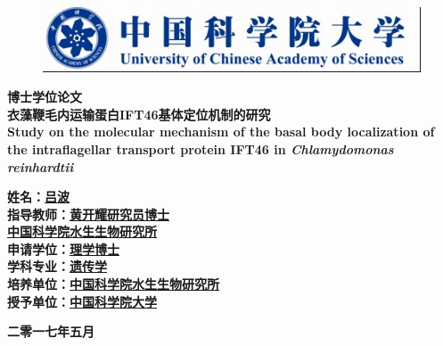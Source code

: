 \begin{titlepage}
\small
{}\uline{\makebox[7em][r]{}}\hfill {}
\uline{\makebox[7em][r]{}}

\uline{\makebox[7em][r]{}}\hfill {}
\uline{\makebox[7em][r]{}}
\normalsize

\vspace{10mm}

\begin{figure}[!h]
\centering
\graphicspath{{figures/}}
\includegraphics[trim=0 1 1 0, clip=true]{logo.jpg}
\end{figure}

\vspace{10mm}

\begin{center}
 \textbf{博士学位论文}\\[10mm]
 \textbf{衣藻鞭毛内运输蛋白IFT46基体定位机制的研究}\\
 \textbf{Study on the molecular mechanism of the basal body localization of the intraflagellar transport protein IFT46 in \textit{Chlamydomonas reinhardtii}}\\[10mm]
\end{center}
\large \textbf{姓\qquad 名：}\uline{\hfill\textbf{吕\quad 波}\hfill}\\
\large \textbf{指导教师：}\uline{\hfill{\textbf{黄开耀}\quad \textbf{研究员}\quad \textbf{博士}}\hfill}\\
\large \makebox[5em][]{}\uline{\hfill{\textbf{中国科学院水生生物研究所}}\hfill}\\
\large \textbf{申请学位：}\uline{\hfill{\textbf{理学博士}}\hfill}\\
\large \textbf{学科专业：}\uline{\hfill{\textbf{遗传学}}\hfill}\\
\large \textbf{培养单位：}\uline{\hfill{\textbf{中国科学院水生生物研究所}}\hfill}\\
\large \textbf{授予单位：}\uline{\hfill{\textbf{中国科学院大学}}\hfill}\\[4mm]
\begin{center}
\textbf{二零一七年五月}
\end{center}
\end{titlepage}

\vspace*{10mm}
\thispagestyle{empty}
